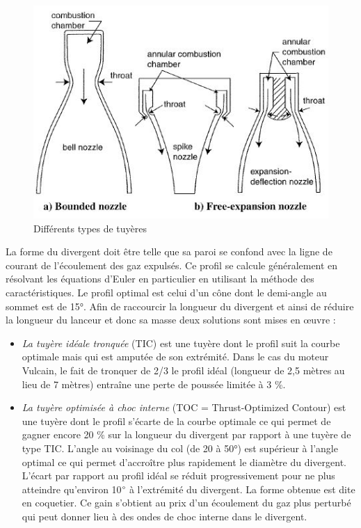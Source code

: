 \documentclass{report}
\begin{document}
\begin{figure}[h!]
    \centering
    \includegraphics[scale=0.6]{47.JPG}
    \caption{Différents types de tuyères}
    \label{47}
\end{figure}

La forme du divergent doit être telle que sa paroi se confond avec la ligne de courant de l'écoulement des gaz expulsés. Ce profil se calcule généralement en résolvant les équations d'Euler en particulier en utilisant la méthode des caractéristiques. Le profil optimal est celui d'un cône dont le demi-angle au sommet est de 15°. Afin de raccourcir la longueur du divergent et ainsi de réduire la longueur du lanceur et donc sa masse deux solutions sont mises en œuvre :

\begin{itemize}
    \item \textit{La tuyère idéale tronquée} (TIC) est une tuyère dont le profil suit la courbe optimale mais qui est amputée de son extrémité. Dans le cas du moteur Vulcain, le fait de tronquer de 2/3 le profil idéal (longueur de 2,5 mètres au lieu de 7 mètres) entraîne une perte de poussée limitée à 3 $\%$.
    \item \textit{La tuyère optimisée à choc interne} (TOC = Thrust-Optimized Contour) est une tuyère dont le profil s'écarte de la courbe optimale ce qui permet de gagner encore 20 $\%$ sur la longueur du divergent par rapport à une tuyère de type TIC. L'angle au voisinage du col (de 20 à 50°) est supérieur à l'angle optimal ce qui permet d'accroître plus rapidement le diamètre du divergent. L'écart par rapport au profil idéal se réduit progressivement pour ne plus atteindre qu'environ 10$\degree$ à l'extrémité du divergent. La forme obtenue est dite en coquetier. Ce gain s'obtient au prix d'un écoulement du gaz plus perturbé qui peut donner lieu à des ondes de choc interne dans le divergent.
\end{itemize}
\end{document}
